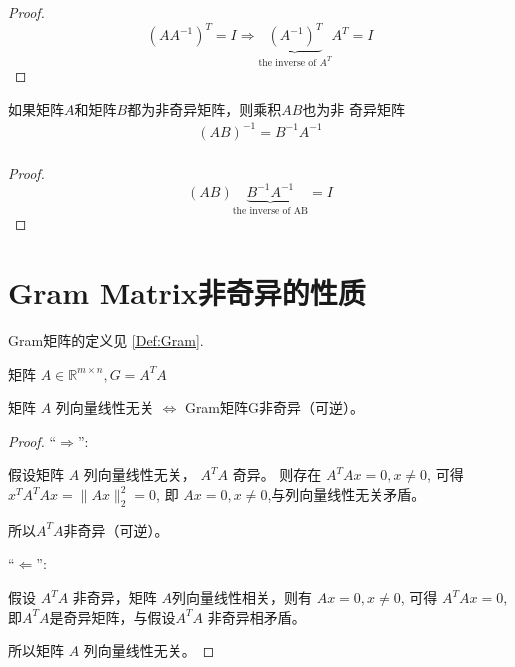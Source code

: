 \begin{proof}
    \begin{equation}\left(A A^{-1}\right)^{T}=I \Rightarrow \underbrace{\left(A^{-1}\right)^{T}}_{\text{the inverse of }A^T}   A^{T}=I\end{equation}
\end{proof}

\begin{corollary}
    如果矩阵$A$和矩阵$B$都为非奇异矩阵，则乘积$AB$也为非 奇异矩阵
\begin{equation}
\begin{array}{l}
(A B)^{-1}=B^{-1} A^{-1} \\
\end{array}
\end{equation}
\end{corollary}

\begin{proof}
    \begin{equation}(A B) \underbrace{B^{-1} A^{-1}} _{\text{the inverse of AB}}=I\end{equation}
\end{proof}

\section{Gram Matrix非奇异的性质}

\label{Sect:GramNonSingular}

Gram矩阵的定义见 \ref{Def:Gram}.

\begin{corollary}
    矩阵 $ A \in \mathbb{R}^{m \times n},   {G}=A^{T} A $

矩阵 $ A $ 列向量线性无关 $ \Leftrightarrow $ Gram矩阵G非奇异（可逆）。
\end{corollary}

\begin{proof}
    “$ \Rightarrow $”: 
    
    假设矩阵 $ A $ 列向量线性无关， $ A^{T} A $ 奇异。  则存在 $ A^{T} A x=0, x \neq 0 $, 可得 $ x^{T} A^{T} A x=\|A x\|_{2}^{2}=0 $, 即 $ A x=0 , x \neq 0$,与列向量线性无关矛盾。

    所以$ A^{T} A $非奇异（可逆）。

    “$ \Leftarrow $”:
    
    假设 $ A^{T} A $ 非奇异，矩阵 $ A $列向量线性相关，则有 $ A x=0, x \neq 0 $, 可得 $ A^{T} A x=0 $, 即$ A^{T} A $是奇异矩阵，与假设$ A^{T} A $ 非奇异相矛盾。
    
    所以矩阵 $ A $ 列向量线性无关。
\end{proof}

